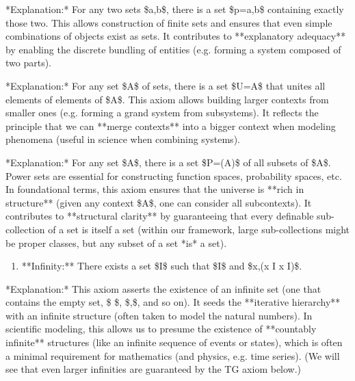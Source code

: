\documentclass[11pt]{article}
\begin{document}
\begin{enumerate}
  \item **Pairing:** \$\forall a,\forall b,\exists p,\forall x,\[x \in p \Leftrightarrow (x=a \vee x=b)]\$.
\end{enumerate}
   *Explanation:* For any two sets \$a,b\$, there is a set \$p={a,b}\$ containing exactly those two. This allows construction of finite sets and ensures that even simple combinations of objects exist as sets. It contributes to **explanatory adequacy** by enabling the discrete bundling of entities (e.g. forming a system composed of two parts).

\begin{enumerate}
  \item **Union:** \$\forall A,\exists U,\forall x,\[x \in U \Leftrightarrow \exists y,(y \in A \wedge x \in y)]\$.
\end{enumerate}
   *Explanation:* For any set \$A\$ of sets, there is a set \$U=\bigcup A\$ that unites all elements of elements of \$A\$. This axiom allows building larger contexts from smaller ones (e.g. forming a grand system from subsystems). It reflects the principle that we can **merge contexts** into a bigger context when modeling phenomena (useful in science when combining systems).

\begin{enumerate}
  \item **Power Set:** \$\forall A,\exists P,\forall x,\[x \in P \Leftrightarrow x \subseteq A]\$.
\end{enumerate}
   *Explanation:* For any set \$A\$, there is a set \$P=(A)\$ of all subsets of \$A\$. Power sets are essential for constructing function spaces, probability spaces, etc. In foundational terms, this axiom ensures that the universe is **rich in structure** (given any context \$A\$, one can consider all subcontexts). It contributes to **structural clarity** by guaranteeing that every definable sub-collection of a set is itself a set (within our framework, large sub-collections might be proper classes, but any subset of a set *is* a set).

\begin{enumerate}
  \item **Infinity:** There exists a set \$I\$ such that \$\varnothing \in I\$ and \$\forall x,(x \in I \rightarrow x  \in I)\$.
\end{enumerate}
   *Explanation:* This axiom asserts the existence of an infinite set (one that contains the empty set, \${ \emptyset }\$, \${\emptyset,{\emptyset}}\$, and so on). It seeds the **iterative hierarchy** with an infinite structure (often taken to model the natural numbers). In scientific modeling, this allows us to presume the existence of **countably infinite** structures (like an infinite sequence of events or states), which is often a minimal requirement for mathematics (and physics, e.g. time series). (We will see that even larger infinities are guaranteed by the TG axiom below.)
\end{document}
